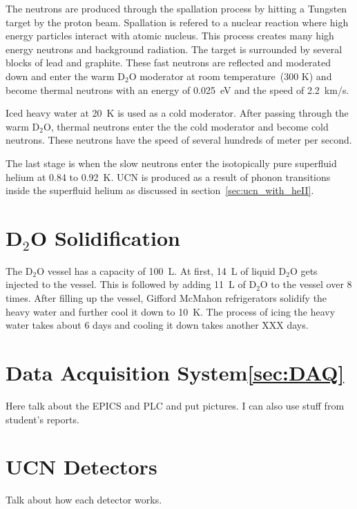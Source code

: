 The neutrons are produced through the spallation process by hitting a
Tungsten target by the proton beam. Spallation is refered to a nuclear
reaction where high energy particles interact with atomic
nucleus. This process creates many high energy neutrons and background
radiation.  The target is surrounded by several blocks of lead and
graphite. These fast neutrons
are reflected and moderated down and enter the warm D$_2$O moderator at room temperature~(300 K) and become thermal
neutrons with an energy of 0.025~eV and the speed of 2.2~km/s.

Iced heavy water at 20~K is used as a cold moderator. After passing
through the warm D$_2$O, thermal neutrons enter the the cold moderator
and become cold neutrons. These neutrons have the speed of several
hundreds of meter per second.

The last stage is when the slow neutrons enter the isotopically pure superfluid helium
at 0.84 to 0.92~K. UCN is produced as a result of phonon transitions
inside the superfluid helium as discussed in section~\ref{sec:ucn_with_heII}.


\section{D$_2$O Solidification}
The D$_2$O vessel has a capacity of 100~L. At first, 14~L of liquid
D$_2$O gets injected to the vessel. This is followed by adding 11~L of
D$_2$O to the vessel over 8 times.  After filling up the vessel,
Gifford McMahon refrigerators solidify the heavy water and further
cool it down to 10~K. The process of icing the heavy water takes about
6 days and cooling it down takes another XXX days.

\section{Data Acquisition System\ref{sec:DAQ}}
Here talk about the EPICS and PLC and put pictures. I can also use
stuff from student's reports.

\section{UCN Detectors\label{sec:detectors}}
Talk about how each detector works.
